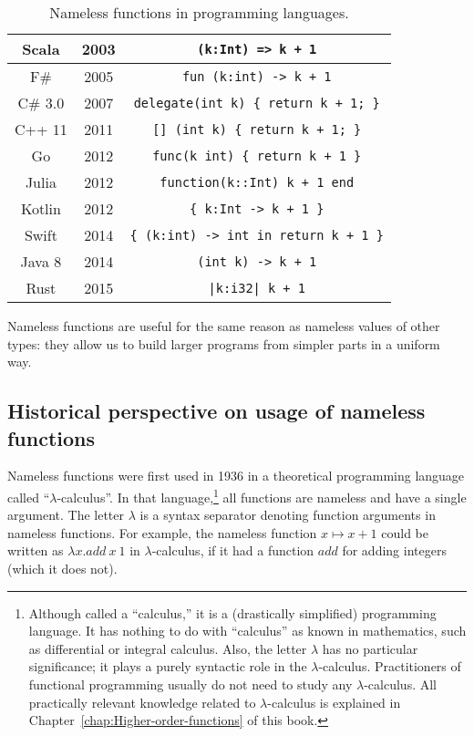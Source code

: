 \begin{wraptable}{r}{0.6\columnwidth}
\begin{centering}
\begin{tabular}{|c|c|c|}
\hline 
{\footnotesize{}Scala} & {\footnotesize{}2003} & \lstinline!(k:Int) => k + 1!\tabularnewline
\hline 
{\footnotesize{}F\#} & {\footnotesize{}2005} & \lstinline!fun (k:int) -> k + 1!\tabularnewline
\hline 
{\footnotesize{}C\# 3.0} & {\footnotesize{}2007} & \lstinline!delegate(int k) { return k + 1; }!\tabularnewline
\hline 
{\footnotesize{}C++ 11} & {\footnotesize{}2011} & \lstinline![] (int k) { return k + 1; }!\tabularnewline
\hline 
{\footnotesize{}Go} & {\footnotesize{}2012} & \lstinline!func(k int) { return k + 1 }!\tabularnewline
\hline 
{\footnotesize{}Julia} & {\footnotesize{}2012} & \lstinline!function(k::Int) k + 1 end!\tabularnewline
\hline 
{\footnotesize{}Kotlin} & {\footnotesize{}2012} & \lstinline!{ k:Int -> k + 1 }!\tabularnewline
\hline 
{\footnotesize{}Swift} & {\footnotesize{}2014} & \lstinline!{ (k:int) -> int in return k + 1 }!\tabularnewline
\hline 
{\footnotesize{}Java 8} & {\footnotesize{}2014} & \lstinline!(int k) -> k + 1!\tabularnewline
\hline 
{\footnotesize{}Rust} & {\footnotesize{}2015} & \lstinline!|k:i32| k + 1!\tabularnewline
\hline 
\end{tabular}
\par\end{centering}
\caption{Nameless functions in programming languages.\label{lambda-functions-table}}
\vspace{-2.5\baselineskip}
\end{wraptable}%

\noindent Nameless functions are useful for the same reason as nameless
values of other types: they allow us to build larger programs from
simpler parts in a uniform way.

\subsection{Historical perspective on usage of nameless functions}

Nameless functions were first used in 1936 in a theoretical programming
language called ``$\lambda$-calculus''.
In that language,\footnote{Although called a ``calculus,'' it is a (drastically simplified)
programming language. It has nothing to do with ``calculus'' as
known in mathematics, such as differential or integral calculus. Also,
the letter $\lambda$ has no particular significance; it plays a purely
syntactic role in the $\lambda$-calculus. Practitioners of functional
programming usually do not need to study any $\lambda$-calculus.
All practically relevant knowledge related to $\lambda$-calculus
is explained in Chapter~\ref{chap:Higher-order-functions} of this
book.} all functions are nameless and have a single argument. The letter
$\lambda$ is a syntax separator denoting function arguments in nameless
functions. For example, the nameless function $x\mapsto x+1$ could
be written as $\lambda x.add~x~1$ in $\lambda$-calculus, if it had
a function $add$ for adding integers (which it does not).

